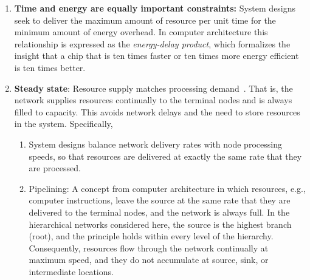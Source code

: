 \documentclass[12pt]{article}
\begin{document}
\begin{enumerate}
\item {\bf Time and energy are equally important constraints:} 
  System designs seek to deliver the maximum amount of
  resource per unit time for the minimum amount of energy overhead. 
  In computer architecture this relationship is expressed as the
  \emph{energy-delay product}, which formalizes the insight that a
  chip that is ten times faster or ten times more energy efficient is
  ten times better. 

\item {\bf Steady state}: Resource supply matches processing
  demand~\cite{banavar10}.  That is, the network supplies
  resources continually to the terminal nodes and is
  always filled to capacity.  This avoids network delays and the need to
  store resources in the system. Specifically,
\begin{enumerate}
\item System designs balance network delivery rates with node
  processing speeds, so that resources are delivered at exactly the
  same rate that they are processed.

\item Pipelining: A concept from computer architecture in which
  resources, e.g., computer instructions, leave the source at
  the same rate that they are delivered to the terminal nodes, and the
  network is always full.  In the hierarchical networks considered
  here, the source is the highest branch (root), and the
  principle holds within every level of the hierarchy.  Consequently,
  resources flow through the network continually at maximum speed, and
  they do not accumulate at source, sink, or
  intermediate locations.
\end{enumerate}


\end{enumerate}
\end{document}
